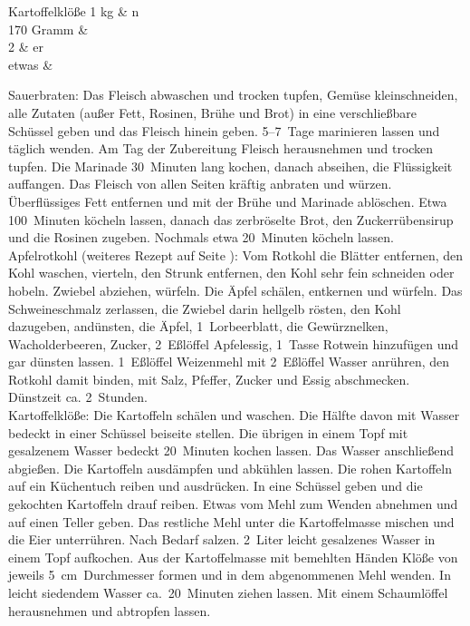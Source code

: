       \begin{zutat}{Kartoffelklöße}
        1\breh{} kg & n \\
	170 Gramm &  \\
	2 & er \\
	etwas &  \\
      \end{zutat}

      \begin{zubereitung}
        Sauerbraten: Das Fleisch abwaschen und trocken tupfen, Gemüse
        kleinschneiden, alle Zutaten (außer Fett, Rosinen, Brühe und Brot) in
        eine verschließbare Schüssel geben und das Fleisch hinein geben.
        5--7~Tage marinieren lassen und täglich wenden. Am Tag der Zubereitung
        Fleisch herausnehmen und trocken tupfen. Die Marinade 30~Minuten lang
        kochen, danach abseihen, die Flüssigkeit auffangen. Das Fleisch von
        allen Seiten kräftig anbraten und würzen. Überflüssiges Fett entfernen
        und mit der Brühe und Marinade ablöschen. Etwa 100~Minuten köcheln
        lassen, danach das zerbröselte Brot, den Zuckerrübensirup und die
        Rosinen zugeben. Nochmals etwa 20~Minuten köcheln lassen. \\
        Apfelrotkohl (weiteres Rezept auf Seite \pageref{rotkohl}): Vom Rotkohl
        die Blätter entfernen, den Kohl waschen, vierteln, den Strunk entfernen,
        den Kohl sehr fein schneiden oder hobeln. Zwiebel abziehen, würfeln. Die
        Äpfel schälen, entkernen und würfeln. Das Schweineschmalz zerlassen, die
        Zwiebel darin hellgelb rösten, den Kohl dazugeben, andünsten, die Äpfel,
        1~Lorbeerblatt, die Gewürznelken, Wacholderbeeren, Zucker, 2~Eßlöffel
        Apfelessig, 1~Tasse Rotwein hinzufügen und gar dünsten lassen.
        1~Eßlöffel Weizenmehl mit 2~Eßlöffel Wasser anrühren, den Rotkohl damit
        binden, mit Salz, Pfeffer, Zucker und Essig abschmecken. Dünstzeit ca.
        2~Stunden. \\
        Kartoffelklöße: Die Kartoffeln schälen und waschen. Die Hälfte davon
        mit Wasser bedeckt in einer Schüssel beiseite stellen. Die übrigen in
        einem Topf mit gesalzenem Wasser bedeckt 20~Minuten kochen lassen. Das
        Wasser anschließend abgießen. Die Kartoffeln ausdämpfen und abkühlen
        lassen. Die rohen Kartoffeln auf ein Küchentuch reiben und ausdrücken.
        In eine Schüssel geben und die gekochten Kartoffeln drauf reiben. Etwas
        vom Mehl zum Wenden abnehmen und auf einen Teller geben. Das restliche
        Mehl unter die Kartoffelmasse mischen und die Eier unterrühren. Nach
        Bedarf salzen. 2\breh{}~Liter leicht gesalzenes Wasser in einem Topf
        aufkochen. Aus der Kartoffelmasse mit bemehlten Händen Klöße von
        jeweils 5~cm~Durchmesser formen und in dem abgenommenen Mehl wenden.
        In leicht siedendem Wasser ca.~20~Minuten ziehen lassen. Mit einem
        Schaumlöffel herausnehmen und abtropfen lassen. \\
      \end{zubereitung}

